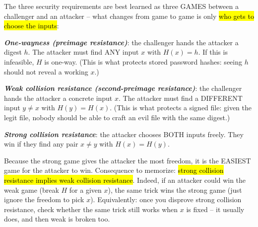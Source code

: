 \documentclass[12pt, a4paper]{article}
\newcommand{\term}[1]{\textbf{\textit{#1}}}        %
\newcommand{\imp}[1]{\hl{#1}}                       %
\begin{document}
The three security requirements are best learned as three GAMES between a challenger and an attacker -- what changes from game to game is only \imp{who gets to choose the inputs}:\begin{tightitem}\item \term{One-wayness (preimage resistance)}: the challenger hands the attacker a digest $h$. The attacker must find ANY input $x$ with $H(x) = h$. If this is infeasible, $H$ is one-way. (This is what protects stored password hashes: seeing $h$ should not reveal a working $x$.)\item \term{Weak collision resistance (second-preimage resistance)}: the challenger hands the attacker a concrete input $x$. The attacker must find a DIFFERENT input $y \neq x$ with $H(y) = H(x)$. (This is what protects a signed file: given the legit file, nobody should be able to craft an evil file with the same digest.)\item \term{Strong collision resistance}: the attacker chooses BOTH inputs freely. They win if they find any pair $x \neq y$ with $H(x) = H(y)$.\end{tightitem}Because the strong game gives the attacker the most freedom, it is the EASIEST game for the attacker to win. Consequence to memorize: \imp{strong collision resistance implies weak collision resistance}. Indeed, if an attacker could win the weak game (break $H$ for a given $x$), the same trick wins the strong game (just ignore the freedom to pick $x$). Equivalently: once you disprove strong collision resistance, check whether the same trick still works when $x$ is fixed -- it usually does, and then weak is broken too.
\end{document}
